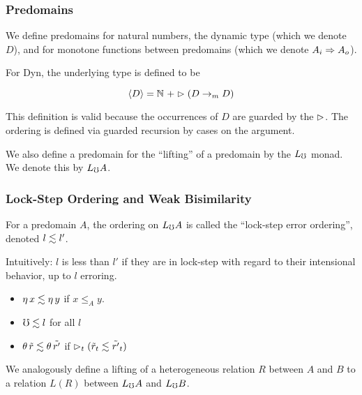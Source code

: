 \documentclass[
	11pt, %
]{beamer}
\begin{document}
\begin{frame}
	\frametitle{Predomains}

	We define predomains for natural numbers, the dynamic type (which we denote $D$), and for monotone functions between predomains (which we denote $A_i \Rightarrow A_o$).

	\medskip
	
  	For Dyn, the underlying type is defined to be 
	
	\[ \langle {D} \rangle = \mathbb{N}\,\, + \vartriangleright (D \to_m D) \]

  	This definition is valid because the occurrences of $D$ are guarded by the $\vartriangleright$.
  	The ordering is defined via guarded recursion by cases on the argument.

	\medskip

	We also define a predomain for the ``lifting'' of a predomain by the $L_\mho$ monad.
	We denote this by $L_\mho A$.

\end{frame}

\begin{frame}
	\frametitle{Lock-Step Ordering and Weak Bisimilarity}
	For a predomain $A$, the ordering on $L_\mho A$ is called the ``lock-step error ordering'', denoted $l \lesssim l'$.

	Intuitively: $l$ is less than $l'$ if they are in lock-step with regard to their
	intensional behavior, up to $l$ erroring.

	\begin{itemize}
		\item 	$\eta\, x \lesssim \eta\, y$ if $x \le_A y$.
		\item 	$\mho \lesssim l$ for all $l$ 
		\item   $\theta\, \tilde{r} \lesssim \theta\, \tilde{r'}$ if
		        $\vartriangleright_t (\tilde{r}_t \lesssim \tilde{r'}_t)$
	\end{itemize}
	
	We analogously define a lifting of a heterogeneous relation $R$ between $A$ and $B$
	to a relation $L(R)$ between $L_\mho A$ and $L_\mho B$.

\end{frame}
\end{document}
